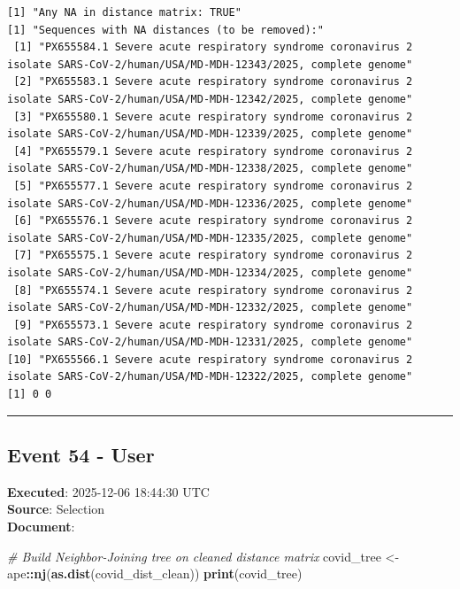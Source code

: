 \documentclass[
  11pt,
]{article}
\newenvironment{Shaded}{\begin{snugshade}}{\end{snugshade}}
\newcommand{\CommentTok}[1]{\textcolor[rgb]{0.56,0.35,0.01}{\textit{#1}}}
\newcommand{\FunctionTok}[1]{\textcolor[rgb]{0.13,0.29,0.53}{\textbf{#1}}}
\newcommand{\NormalTok}[1]{#1}
\newcommand{\OtherTok}[1]{\textcolor[rgb]{0.56,0.35,0.01}{#1}}
\newcommand{\SpecialCharTok}[1]{\textcolor[rgb]{0.81,0.36,0.00}{\textbf{#1}}}
\newenvironment{rpoutput}{\vspace{0.5em}\begin{snugshade}}{\end{snugshade}}
\begin{document}
\begin{rpoutput}

\begin{verbatim}
[1] "Any NA in distance matrix: TRUE"
[1] "Sequences with NA distances (to be removed):"
 [1] "PX655584.1 Severe acute respiratory syndrome coronavirus 2 isolate SARS-CoV-2/human/USA/MD-MDH-12343/2025, complete genome"
 [2] "PX655583.1 Severe acute respiratory syndrome coronavirus 2 isolate SARS-CoV-2/human/USA/MD-MDH-12342/2025, complete genome"
 [3] "PX655580.1 Severe acute respiratory syndrome coronavirus 2 isolate SARS-CoV-2/human/USA/MD-MDH-12339/2025, complete genome"
 [4] "PX655579.1 Severe acute respiratory syndrome coronavirus 2 isolate SARS-CoV-2/human/USA/MD-MDH-12338/2025, complete genome"
 [5] "PX655577.1 Severe acute respiratory syndrome coronavirus 2 isolate SARS-CoV-2/human/USA/MD-MDH-12336/2025, complete genome"
 [6] "PX655576.1 Severe acute respiratory syndrome coronavirus 2 isolate SARS-CoV-2/human/USA/MD-MDH-12335/2025, complete genome"
 [7] "PX655575.1 Severe acute respiratory syndrome coronavirus 2 isolate SARS-CoV-2/human/USA/MD-MDH-12334/2025, complete genome"
 [8] "PX655574.1 Severe acute respiratory syndrome coronavirus 2 isolate SARS-CoV-2/human/USA/MD-MDH-12332/2025, complete genome"
 [9] "PX655573.1 Severe acute respiratory syndrome coronavirus 2 isolate SARS-CoV-2/human/USA/MD-MDH-12331/2025, complete genome"
[10] "PX655566.1 Severe acute respiratory syndrome coronavirus 2 isolate SARS-CoV-2/human/USA/MD-MDH-12322/2025, complete genome"
[1] 0 0
\end{verbatim}

\end{rpoutput}

\begin{center}\rule{0.5\linewidth}{0.5pt}\end{center}

\subsection{Event 54 - User}\label{event-54---user}

\textbf{Executed}: 2025-12-06 18:44:30 UTC\\
\textbf{Source}: Selection\\
\textbf{Document}:

\begin{Shaded}
\begin{Highlighting}[]
\CommentTok{\# Build Neighbor{-}Joining tree on cleaned distance matrix}
\NormalTok{covid\_tree }\OtherTok{\textless{}{-}}\NormalTok{ ape}\SpecialCharTok{::}\FunctionTok{nj}\NormalTok{(}\FunctionTok{as.dist}\NormalTok{(covid\_dist\_clean))}
\FunctionTok{print}\NormalTok{(covid\_tree)}
\end{Highlighting}
\end{Shaded}
\end{document}
